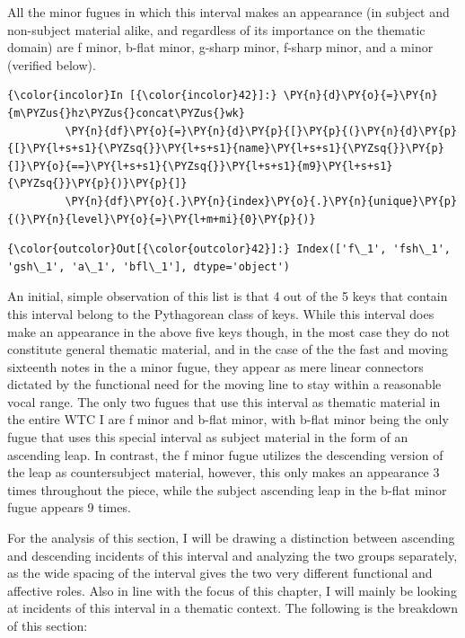 All the minor fugues in which this interval makes an appearance (in
subject and non-subject material alike, and regardless of its importance
on the thematic domain) are f minor, b-flat minor, g-sharp minor,
f-sharp minor, and a minor (verified below).

    \begin{Verbatim}[commandchars=\\\{\}]
{\color{incolor}In [{\color{incolor}42}]:} \PY{n}{d}\PY{o}{=}\PY{n}{m\PYZus{}hz\PYZus{}concat\PYZus{}wk}
         \PY{n}{df}\PY{o}{=}\PY{n}{d}\PY{p}{[}\PY{p}{(}\PY{n}{d}\PY{p}{[}\PY{l+s+s1}{\PYZsq{}}\PY{l+s+s1}{name}\PY{l+s+s1}{\PYZsq{}}\PY{p}{]}\PY{o}{==}\PY{l+s+s1}{\PYZsq{}}\PY{l+s+s1}{m9}\PY{l+s+s1}{\PYZsq{}}\PY{p}{)}\PY{p}{]}
         \PY{n}{df}\PY{o}{.}\PY{n}{index}\PY{o}{.}\PY{n}{unique}\PY{p}{(}\PY{n}{level}\PY{o}{=}\PY{l+m+mi}{0}\PY{p}{)}
\end{Verbatim}
\begin{Verbatim}[commandchars=\\\{\}]
{\color{outcolor}Out[{\color{outcolor}42}]:} Index(['f\_1', 'fsh\_1', 'gsh\_1', 'a\_1', 'bfl\_1'], dtype='object')
\end{Verbatim}
    An initial, simple observation of this list is that 4 out of the 5 keys
that contain this interval belong to the Pythagorean class of keys.
While this interval does make an appearance in the above five keys
though, in the most case they do not constitute general thematic
material, and in the case of the the fast and moving sixteenth notes in
the a minor fugue, they appear as mere linear connectors dictated by the
functional need for the moving line to stay within a reasonable vocal
range. The only two fugues that use this interval as thematic material
in the entire WTC I are f minor and b-flat minor, with b-flat minor
being the only fugue that uses this special interval as subject material
in the form of an ascending leap. In contrast, the f minor fugue
utilizes the descending version of the leap as countersubject material,
however, this only makes an appearance 3 times throughout the piece,
while the subject ascending leap in the b-flat minor fugue appears 9
times.

For the analysis of this section, I will be drawing a distinction
between ascending and descending incidents of this interval and
analyzing the two groups separately, as the wide spacing of the interval
gives the two very different functional and affective roles. Also in
line with the focus of this chapter, I will mainly be looking at
incidents of this interval in a thematic context. The following is the
breakdown of this section:

